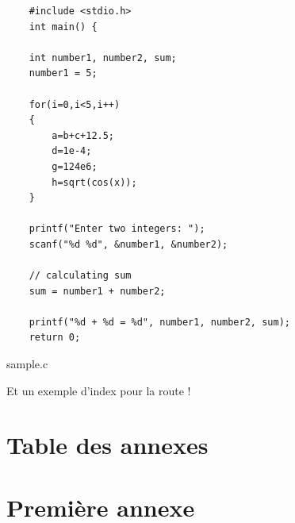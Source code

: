 \documentclass[a4paper,11pt]{report}    %
\begin{document}
\begin{listing}[H]
\begin{verbatim}
    #include <stdio.h>
    int main() {    

    int number1, number2, sum;
    number1 = 5;
    
    for(i=0,i<5,i++)
    {
        a=b+c+12.5;
        d=1e-4;
        g=124e6;
        h=sqrt(cos(x));
    }
    
    printf("Enter two integers: ");
    scanf("%d %d", &number1, &number2);

    // calculating sum
    sum = number1 + number2;      
    
    printf("%d + %d = %d", number1, number2, sum);
    return 0;
\end{verbatim}
\caption{sample.c}
\label{lst:sample.c}
\end{listing}

Et un exemple d'index pour la route !



\newpage
\listoffigures

\newpage
\listoftables

\newpage
\listofmyequations

\newpage
\listoflistings

\newpage
\printindex

\newpage
\printbibliography[heading=bibintoc]



\begin{appendices}

\chapter*{Table des annexes}
\startcontents[chapter]

\chapter{Première annexe}

\cite{CitekeyBook}



\end{appendices}

\end{document}
